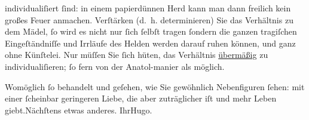                individualiſiert{ }ſind: in einem papierdünnen Herd kann man dann freilich kein großes
               Feuer anmachen. {\pb}Verſtärken \introOben{}(d. h. determinieren)\introOben{} Sie das Verhältnis zu dem Mädel,{ }ſo wird
               es nicht nur{ }ſich{ }ſelbſt tragen{ }ſondern die ganzen tragiſchen Eingeſtändniſſe und
               Irrläufe des Helden werden darauf ruhen können, und ganz ohne Künſtelei. Nur müſſen
               Sie{ }ſich hüten, das Verhältnis \uline{übermäßig} zu
               individualiſieren;{ }ſo fern von der Anatol-manier
               als möglich.\pend
           
\pstart
           Womöglich{ }ſo behandelt und geſehen, wie Sie gewöhnlich Nebenfiguren{ }ſehen: mit einer{ }ſcheinbar geringeren Liebe, die aber zuträglicher iſt und mehr Leben giebt.\hspace*{2.5em}Nächſtens etwas anderes.\pend
           \pstart Ihr\spacefill\mbox{Hugo.}\pend{}\endnumbering{}  \newcommand{\dateiname}{L00564}\newcommand{\titel}{Hugo von Hofmannsthal an Arthur Schnitzler, 16. 7. [1896]}\newcommand{\editorInnen}{Martin Anton Müller und Gerd-Hermann Susen}

